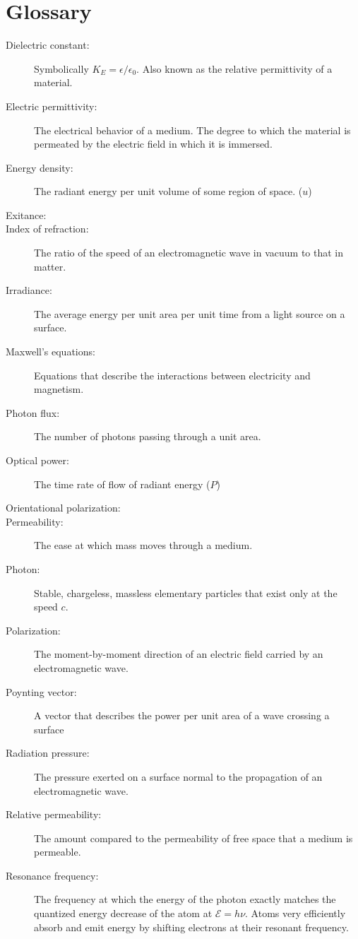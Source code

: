 \documentclass[12pt]{report}
\begin{document}
\section{Glossary}
\begin{description}
\item[Dielectric constant: ] Symbolically $K_E = \epsilon/\epsilon_0$. Also known as the relative permittivity of a material. 
\item[Electric permittivity: ] The electrical behavior of a medium. The degree to which the material is permeated by the electric field in which it is immersed. 
\item[Energy density: ] The radiant energy per unit volume of some region of space. ($u$)
\item[Exitance: ]
\item[Index of refraction: ] The ratio of the speed of an electromagnetic wave in vacuum to that in matter. 
\item[Irradiance: ] The average energy per unit area per unit time from a light source on a surface. 
\item[Maxwell's equations: ] Equations that describe the interactions between electricity and magnetism. 
\item[Photon flux: ] The number of photons passing through a unit area. 
\item[Optical power: ] The time rate of flow of radiant energy ($P$)
\item[Orientational polarization: ]
\item[Permeability: ] The ease at which mass moves through a medium. 
\item[Photon: ] Stable, chargeless, massless elementary particles that exist only at the speed $c$. 
\item[Polarization: ] The moment-by-moment direction of an electric field carried by an electromagnetic wave. 
\item[Poynting vector: ] A vector that describes the power per unit area of a wave crossing a surface 
\item[Radiation pressure: ] The pressure exerted on a surface normal to the propagation of an electromagnetic wave.
\item[Relative permeability: ] The amount compared to the permeability of free space that a medium is permeable. 
\item[Resonance frequency: ] The frequency at which the energy of the photon exactly matches the quantized energy decrease of the atom at $\mathcal{E} = h\nu$. Atoms very efficiently absorb and emit energy by shifting electrons at their resonant frequency. 

\end{description}
\end{document}

